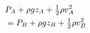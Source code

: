 \documentclass[preview]{standalone}
\begin{document}
\begin{align*}
\special{dvisvgm:raw <g id='unique000'>}& P_A + \rho g z_A + \tfrac{1}{2} \rho v_A^2 \\ & = P_B + \rho g z_B + \tfrac{1}{2} \rho v_B^2\special{dvisvgm:raw </g>}
\end{align*}
\end{document}
